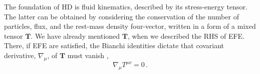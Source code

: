 %
%

The foundation of \ac{HD} is fluid kinematics, described by its 
stress-energy tensor. The latter can be obtained by considering the 
conservation of the number of particles, flux, and the rest-mass density 
four-vector, written in a form of a mixed tensor $\boldsymbol{T}$.
We have already mentioned $\boldsymbol{T}$, when we described the \ac{RHS} of \ac{EFE}.
There, if \ac{EFE} are satisfied, the Bianchi identities dictate that 
covariant derivative, $\nabla_{\mu}$, of $\boldsymbol{T}$ must vanish \ie, 
%
\begin{equation}
\nabla_{\mu}{T^{\mu\nu}} = 0\, .
\label{eq:theory:tmunu_eq_0}
\end{equation}
%

